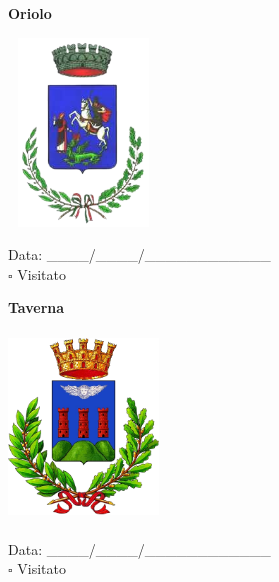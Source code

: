 \documentclass[a5paper,12pt]{article}
\begin{document}
\newpage

\noindent
\begin{minipage}[t]{0.45\textwidth}
    \begin{center}
        \textbf{Oriolo}
    \end{center}
    \vspace{-0.5cm} %
    \begin{center}
        \includegraphics[height= 5cm, width=4cm]{Calabria/Oriolo-Stemma.png}
    \end{center}
    \vspace{-0.4cm} %
    \begin{flushleft}
        Data: \_\_\_\_/\_\_\_\_/\_\_\_\_\_\_\_\_\_\_\_\_ \\
        $\square$ Visitato
    \end{flushleft}
\end{minipage}
\hfill
\noindent
\begin{minipage}[t]{0.45\textwidth}
    \begin{center}
        \textbf{Taverna}
    \end{center}
    \vspace{-0.5cm} %
    \begin{center}
        \includegraphics[height= 5cm, width=4cm]{Calabria/Taverna-Stemma.png}
    \end{center}
    \vspace{-0.4cm} %
    \begin{flushleft}
        Data: \_\_\_\_/\_\_\_\_/\_\_\_\_\_\_\_\_\_\_\_\_ \\
        $\square$ Visitato
    \end{flushleft}
\end{minipage}
\end{document}
